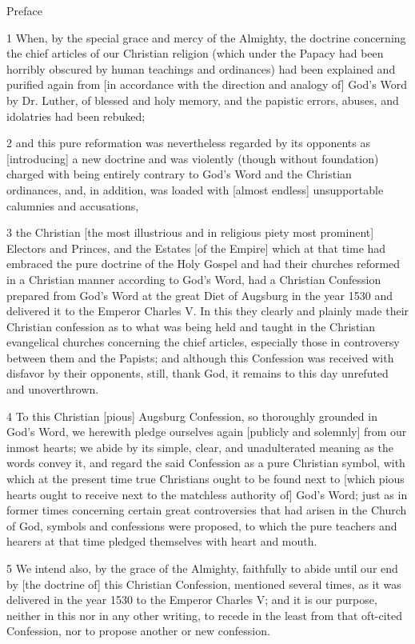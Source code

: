 Preface

1 When, by the special grace and mercy of the Almighty, the doctrine concerning the chief articles of our Christian religion (which under the Papacy had been horribly obscured by human teachings and ordinances) had been explained and purified again from [in accordance with the direction and analogy of] God’s Word by Dr. Luther, of blessed and holy memory, and the papistic errors, abuses, and idolatries had been rebuked;

2 and this pure reformation was nevertheless regarded by its opponents as [introducing] a new doctrine and was violently (though without foundation) charged with being entirely contrary to God’s Word and the Christian ordinances, and, in addition, was loaded with [almost endless] unsupportable calumnies and accusations,

3 the Christian [the most illustrious and in religious piety most prominent] Electors and Princes, and the Estates [of the Empire] which at that time had embraced the pure doctrine of the Holy Gospel and had their churches reformed in a Christian manner according to God’s Word, had a Christian Confession prepared from God’s Word at the great Diet of Augsburg in the year 1530 and delivered it to the Emperor Charles V. In this they clearly and plainly made their Christian confession as to what was being held and taught in the Christian evangelical churches concerning the chief articles, especially those in controversy between them and the Papists; and although this Confession was received with disfavor by their opponents, still, thank God, it remains to this day unrefuted and unoverthrown.

4 To this Christian [pious] Augsburg Confession, so thoroughly grounded in God’s Word, we herewith pledge ourselves again [publicly and solemnly] from our inmost hearts; we abide by its simple, clear, and unadulterated meaning as the words convey it, and regard the said Confession as a pure Christian symbol, with which at the present time true Christians ought to be found next to [which pious hearts ought to receive next to the matchless authority of] God’s Word; just as in former times concerning certain great controversies that had arisen in the Church of God, symbols and confessions were proposed, to which the pure teachers and hearers at that time pledged themselves with heart and mouth.

5 We intend also, by the grace of the Almighty, faithfully to abide until our end by [the doctrine of] this Christian Confession, mentioned several times, as it was delivered in the year 1530 to the Emperor Charles V; and it is our purpose, neither in this nor in any other writing, to recede in the least from that oft-cited Confession, nor to propose another or new confession.

